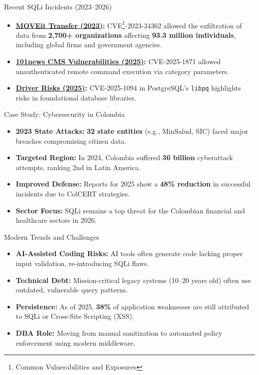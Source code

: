 \documentclass[aspectratio=169]{beamer}
\begin{document}
\begin{frame}{Recent SQLi Incidents (2023--2026)}
    \begin{itemize}
        \item \textbf{\href{https://community.progress.com/s/article/MOVEit-Transfer-Critical-Vulnerability-31May2023}{MOVEit Transfer (2023)}:} CVE\footnote{Common Vulnerabilities and Exposures}-2023-34362 allowed the exfiltration of data from \textbf{2,700+ organizations} affecting \textbf{93.3 million individuals}, including global firms and government agencies.
        \item \textbf{\href{https://nvd.nist.gov/vuln/detail/CVE-2025-1871}{101news CMS Vulnerabilities (2025)}:} CVE-2025-1871 allowed unauthenticated remote command execution via category parameters.
        \item \textbf{\href{https://www.postgresql.org/support/security/CVE-2025-1094/}{Driver Risks (2025)}:} CVE-2025-1094 in PostgreSQL's \texttt{libpq} highlights risks in foundational database libraries.
    \end{itemize}
\end{frame}

\begin{frame}{Case Study: Cybersecurity in Colombia}
    \begin{itemize}
        \item \textbf{2023 State Attacks:} \textbf{32 state entities} (e.g., MinSalud, SIC) faced major breaches compromising citizen data.
        \item \textbf{Targeted Region:} In 2024, Colombia suffered \textbf{36 billion} cyberattack attempts, ranking 2nd in Latin America.
        \item \textbf{Improved Defense:} Reports for 2025 show a \textbf{48\% reduction} in successful incidents due to ColCERT strategies.
        \item \textbf{Sector Focus:} SQLi remains a top threat for the Colombian financial and healthcare sectors in 2026.
    \end{itemize}
\end{frame}

\begin{frame}{Modern Trends and Challenges}
    \begin{itemize}
        \item \textbf{AI-Assisted Coding Risks:} AI tools often generate code lacking proper input validation, re-introducing SQLi flaws.
        \item \textbf{Technical Debt:} Mission-critical legacy systems (10--20 years old) often use outdated, vulnerable query patterns.
        \item \textbf{Persistence:} As of 2025, \textbf{38\%} of application weaknesses are still attributed to SQLi or Cross-Site Scripting (XSS).
        \item \textbf{DBA Role:} Moving from manual sanitization to automated policy enforcement using modern middleware.
    \end{itemize}
\end{frame}
\end{document}

